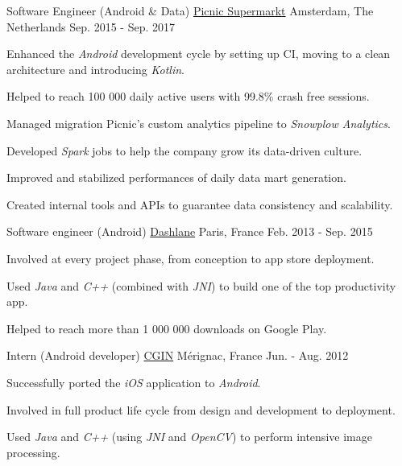 
	\begin{cventries}
	
		\cventry
			{Software Engineer (Android \& Data)}
			{\href{https://www.picnic.nl}{Picnic Supermarkt}}
			{Amsterdam, The Netherlands}
			{Sep. 2015 - Sep. 2017}
			{
				\begin{cvitems}
					\item Enhanced the \textit{Android} development cycle by setting up CI, moving to a clean architecture and introducing \textit{Kotlin}.
					\item Helped to reach 100 000 daily active users with 99.8\% crash free sessions.
					\item Managed migration Picnic's custom analytics pipeline to \textit{Snowplow Analytics}.
					\item Developed \textit{Spark} jobs to help the company grow its data-driven culture.
					\item Improved and stabilized performances of daily data mart generation.
					\item Created internal tools and APIs to guarantee data consistency and scalability.
				\end{cvitems}
			}
		
		\cventry
			{Software engineer (Android)}
			{\href{https://www.dashlane.com}{Dashlane}}
			{Paris, France}
			{Feb. 2013 - Sep. 2015}
			{
				\begin{cvitems}
					\item Involved at every project phase, from conception to app store deployment.
					\item Used \textit{Java} and \textit{C++} (combined with \textit{JNI}) to build one of the top productivity app.
					\item Helped to reach more than 1 000 000 downloads on Google Play.
				\end{cvitems}
			}
		
		\cventry
			{Intern (Android developer)}
			{\href{https://www.photoservice.com}{CGIN}}
			{Mérignac, France}
			{Jun. - Aug. 2012}
			{
				\begin{cvitems}
					\item Successfully ported the \textit{iOS} application to \textit{Android}.
					\item Involved in full product life cycle from design and development to deployment.
					\item Used \textit{Java} and \textit{C++} (using \textit{JNI} and \textit{OpenCV}) to perform intensive image processing.
				\end{cvitems}
			}
		

\end{cventries}
